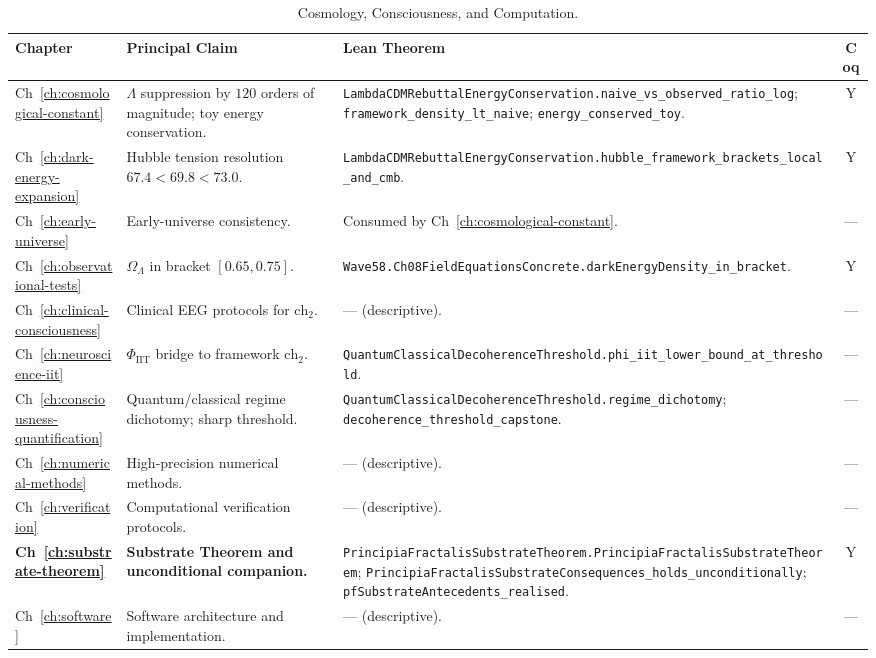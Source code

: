 \begin{table}[h]
\centering
\footnotesize
\caption{Cosmology, Consciousness, and Computation.}
\begin{tabular}{p{1.7cm}p{4.2cm}p{5.6cm}c}
\toprule
\textbf{Chapter} & \textbf{Principal Claim} & \textbf{Lean Theorem} & \textbf{Coq} \\
\midrule
Ch~\ref{ch:cosmological-constant}
& $\Lambda$ suppression by $120$ orders of magnitude; toy energy conservation.
& \texttt{LambdaCDMRebuttalEnergyConservation.naive\_vs\_observed\_ratio\_log}; \texttt{framework\_density\_lt\_naive}; \texttt{energy\_conserved\_toy}.
& Y \\
Ch~\ref{ch:dark-energy-expansion}
& Hubble tension resolution $67.4 < 69.8 < 73.0$.
& \texttt{LambdaCDMRebuttalEnergyConservation.hubble\_framework\_brackets\_local\_and\_cmb}.
& Y \\
Ch~\ref{ch:early-universe}
& Early-universe consistency.
& Consumed by Ch~\ref{ch:cosmological-constant}.
& --- \\
Ch~\ref{ch:observational-tests}
& $\Omega_\Lambda$ in bracket $[0.65, 0.75]$.
& \texttt{Wave58.Ch08FieldEquationsConcrete.darkEnergyDensity\_in\_bracket}.
& Y \\
Ch~\ref{ch:clinical-consciousness}
& Clinical EEG protocols for $\text{ch}_2$.
& --- (descriptive).
& --- \\
Ch~\ref{ch:neuroscience-iit}
& $\Phi_{\text{IIT}}$ bridge to framework $\text{ch}_2$.
& \texttt{QuantumClassicalDecoherenceThreshold.phi\_iit\_lower\_bound\_at\_threshold}.
& --- \\
Ch~\ref{ch:consciousness-quantification}
& Quantum/classical regime dichotomy; sharp threshold.
& \texttt{QuantumClassicalDecoherenceThreshold.regime\_dichotomy}; \texttt{decoherence\_threshold\_capstone}.
& --- \\
Ch~\ref{ch:numerical-methods}
& High-precision numerical methods.
& --- (descriptive).
& --- \\
Ch~\ref{ch:verification}
& Computational verification protocols.
& --- (descriptive).
& --- \\
\textbf{Ch~\ref{ch:substrate-theorem}}
& \textbf{Substrate Theorem and unconditional companion.}
& \texttt{PrincipiaFractalisSubstrateTheorem.PrincipiaFractalisSubstrateTheorem}; \texttt{PrincipiaFractalisSubstrateConsequences\_holds\_unconditionally}; \texttt{pfSubstrateAntecedents\_realised}.
& Y \\
Ch~\ref{ch:software}
& Software architecture and implementation.
& --- (descriptive).
& --- \\
\bottomrule
\end{tabular}
\end{table}

